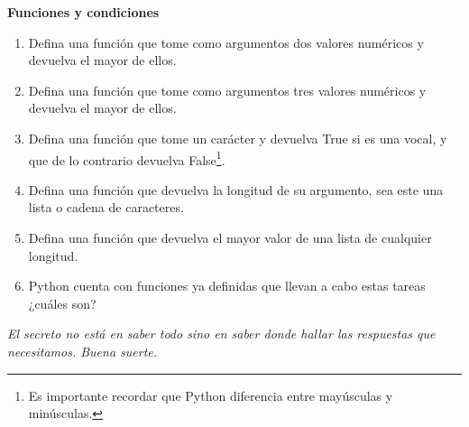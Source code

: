 \documentclass[12pt, oneside, a4paper, spanish]{article}
\begin{document}
\textbf{Funciones y condiciones}
\begin{enumerate}
	\item Defina una función que tome como argumentos dos valores numéricos y devuelva el mayor de ellos. 
	\item Defina una función que tome como argumentos tres valores numéricos y devuelva el mayor de ellos.
	\item Defina una función que tome un carácter y devuelva True si es una vocal, y que de lo contrario devuelva False\footnote{Es importante recordar que Python diferencia entre mayúsculas y minúsculas.}.
	\item Defina una función que devuelva la longitud de su argumento, sea este una lista o cadena de caracteres.
	\item Defina una función que devuelva el mayor valor de una lista de cualquier longitud.
	\item Python cuenta con funciones ya definidas que llevan a cabo estas tareas ¿cuáles son?
\end{enumerate}

\begin{center}
	\textit{El secreto no está en saber todo sino en saber donde hallar las respuestas que necesitamos. Buena suerte.}
\end{center}
\end{document}
